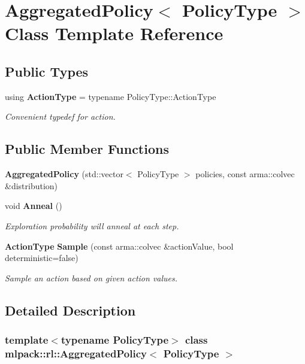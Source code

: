 \section{Aggregated\+Policy$<$ Policy\+Type $>$ Class Template Reference}
\label{classmlpack_1_1rl_1_1AggregatedPolicy}
\subsection*{Public Types}
\begin{DoxyCompactItemize}
\item 
using \textbf{ Action\+Type} = typename Policy\+Type\+::\+Action\+Type
\begin{DoxyCompactList}\small\item\em Convenient typedef for action. \end{DoxyCompactList}\end{DoxyCompactItemize}
\subsection*{Public Member Functions}
\begin{DoxyCompactItemize}
\item 
\textbf{ Aggregated\+Policy} (std\+::vector$<$ Policy\+Type $>$ policies, const arma\+::colvec \&distribution)
\item 
void \textbf{ Anneal} ()
\begin{DoxyCompactList}\small\item\em Exploration probability will anneal at each step. \end{DoxyCompactList}\item 
\textbf{ Action\+Type} \textbf{ Sample} (const arma\+::colvec \&action\+Value, bool deterministic=false)
\begin{DoxyCompactList}\small\item\em Sample an action based on given action values. \end{DoxyCompactList}\end{DoxyCompactItemize}


\subsection{Detailed Description}
\subsubsection*{template$<$typename Policy\+Type$>$\newline
class mlpack\+::rl\+::\+Aggregated\+Policy$<$ Policy\+Type $>$}


